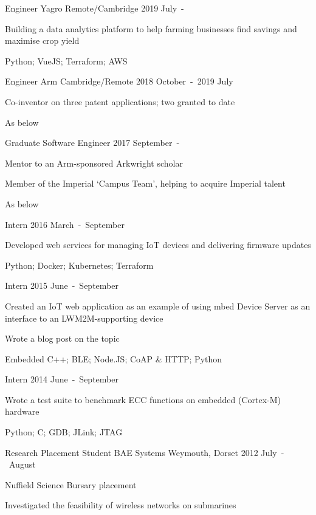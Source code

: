 \begin{cventries}

\cventry
  {Engineer}
  {Yagro}
  {Remote/Cambridge}
  {2019 July~-}
  {\begin{cvitems}
    \item {Building a data analytics platform to help farming businesses find savings and maximise crop yield}
    \item {Python; VueJS; Terraform; AWS}
  \end{cvitems}}

\cventry
  {Engineer}
  {Arm}
  {Cambridge/Remote}
  {2018 October~-~2019 July}
  {\begin{cvitems}
    \item {Co-inventor on three patent applications; two granted to date}
    \item {As below}
  \end{cvitems}}

\cventryprevrole
  {Graduate Software Engineer}
  {2017 September~-}
  {\begin{cvitems}
    \item {Mentor to an Arm-sponsored Arkwright scholar}
    \item {Member of the Imperial `Campus Team', helping to acquire Imperial talent}
    \item {As below}
  \end{cvitems}}

\cventryprevrole
  {Intern}
  {2016 March~-~September}
  {\begin{cvitems}
    \item {Developed web services for managing IoT devices and delivering firmware updates}
    \item {Python; Docker; Kubernetes; Terraform}
  \end{cvitems}}

\cventryprevrole
  {Intern}
  {2015 June~-~September}
  {\begin{cvitems}
    \item {Created an IoT web application as an example of using mbed Device Server as an interface to an LWM2M-supporting device}
    \item {Wrote a blog post on the topic}
    \item {Embedded C++; BLE; Node.JS; CoAP \& HTTP; Python}
  \end{cvitems}}

\cventryprevrole
  {Intern}
  {2014 June~-~September}
  {\begin{cvitems}
    \item {Wrote a test suite to benchmark ECC functions on embedded (Cortex-M) hardware}
    \item {Python; C; GDB; JLink; JTAG}
  \end{cvitems}}

\cventry
  {Research Placement Student}
  {BAE Systems}
  {Weymouth, Dorset}
  {2012 July~-~August}
  {\begin{cvitems}
    \item {Nuffield Science Bursary placement}
    \item {Investigated the feasibility of wireless networks on submarines}
  \end{cvitems}}

\end{cventries}
